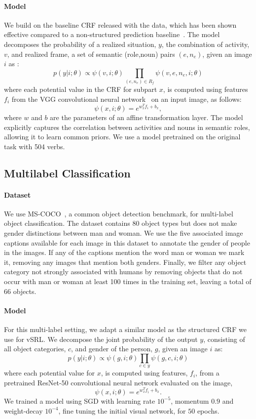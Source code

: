 \paragraph{Model}
We build on the baseline CRF released with the data, which has been shown effective compared to a non-structured prediction baseline~\cite{yatskar2016situation}. The model decomposes the probability of a realized situation, $y$, the combination of activity, $v$, and realized frame, a set of semantic (role,noun) pairs $(e,n_e)$, given an image $i$ as :
$$ p(y |i; \theta) \propto \psi(v,i; \theta)\prod_{(e,n_e) \in R_f} \psi(v,e,n_e,i; \theta)$$
where each potential value in the CRF for subpart $x$, is computed using features $f_i$ from the VGG convolutional neural network~\cite{simonyan2014very} on an input image, as follows: $$\psi(x, i; \theta) = e^{w_x^{T}f_i + b_x},$$ where $w$ and $b$ are the parameters of an affine transformation layer. The model explicitly captures the correlation between activities and nouns in semantic roles, allowing it to learn common priors. 
We use a model pretrained on the original task with 504 verbs. 

\subsection{Multilabel Classification}
\paragraph{Dataset}
We use MS-COCO~\cite{lin2014microsoft}, a common object detection benchmark, for multi-label object classification.
The dataset contains 80 object types but does not make gender distinctions between man and woman.
We use the five associated image captions available for each image in this dataset to annotate the gender of people in the images. 
If any of the captions mention the word man or woman we mark it, removing any images that mention both genders. 
Finally, we filter any object category not strongly associated with humans by removing objects that do not occur with man or woman at least 100 times in the training set, leaving a total of 66 objects.
\paragraph{Model}
For this multi-label setting, we adapt a similar model as the structured CRF we use for vSRL. 
We decompose the joint probability of the output $y$, consisting of all object categories, $c$, and gender of the person, $g$, given an image $i$  as:
$$p(y |i ; \theta) \propto \psi(g,i; \theta)\prod_{c \in y} \psi(g,c,i; \theta)$$
where each potential value for $x$, is computed using features, $f_i$, from a pretrained ResNet-50 convolutional neural network evaluated on the image, $$\psi(x, i; \theta) = e^{w_x^{T}f_i + b_x}.$$
We trained a model using SGD with learning rate $10^{-5}$, momentum $0.9$ and weight-decay $10^{-4}$, fine tuning the initial visual network, for $50$ epochs.

